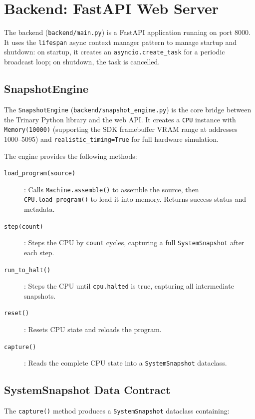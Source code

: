 \documentclass[10pt,a4paper,twoside]{book}
\begin{document}
\section{Backend: FastAPI Web Server}

The backend (\texttt{backend/main.py}) is a FastAPI application running on
port 8000. It uses the \texttt{lifespan} async context manager pattern to
manage startup and shutdown: on startup, it creates an
\texttt{asyncio.create\_task} for a periodic broadcast loop; on shutdown,
the task is cancelled.

\subsection{SnapshotEngine}

The \texttt{SnapshotEngine} (\texttt{backend/snapshot\_engine.py}) is the
core bridge between the Trinary Python library and the web API. It
creates a \texttt{CPU} instance with \texttt{Memory(10000)} (supporting the
SDK framebuffer VRAM range at addresses 1000--5095) and
\texttt{realistic\_timing=True} for full hardware simulation.

The engine provides the following methods:
\begin{description}
    \item[\texttt{load\_program(source)}]: Calls \texttt{Machine.assemble()}
          to assemble the source, then \texttt{CPU.load\_program()} to
          load it into memory. Returns success status and metadata.
    \item[\texttt{step(count)}]: Steps the CPU by \texttt{count} cycles,
          capturing a full \texttt{SystemSnapshot} after each step.
    \item[\texttt{run\_to\_halt()}]: Steps the CPU until \texttt{cpu.halted}
          is true, capturing all intermediate snapshots.
    \item[\texttt{reset()}]: Resets CPU state and reloads the program.
    \item[\texttt{capture()}]: Reads the complete CPU state into a
          \texttt{SystemSnapshot} dataclass.
\end{description}

\subsection{SystemSnapshot Data Contract}

The \texttt{capture()} method produces a \texttt{SystemSnapshot} dataclass
containing:
\end{document}
